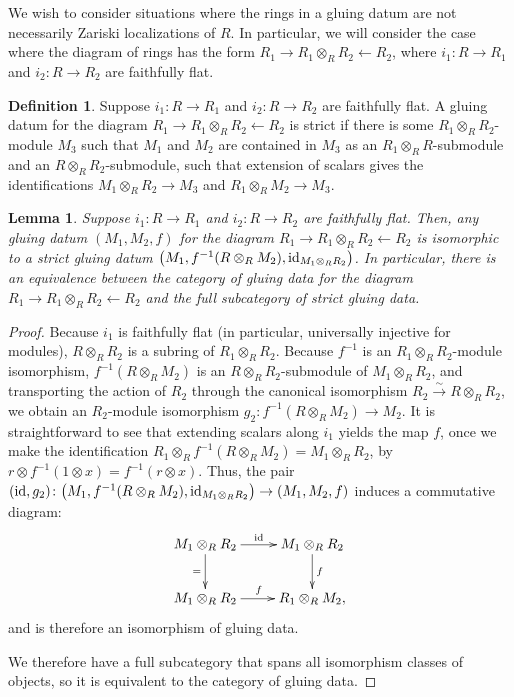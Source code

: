 \documentclass[pdftex]{sigma}
\newcommand{\simto}{\overset{\sim}{\to}}
\newtheorem{lem}[thm]{Lemma}
\theoremstyle{definition}
\newtheorem{defn}[thm]{Definition}
\begin{document}
We wish to consider situations where the rings in a gluing datum are not necessarily Zariski localizations of $R$. In particular, we will consider the case where the diagram of rings has the form $R_1 \to R_1 \otimes_{R} R_2 \leftarrow R_2$, where $i_1\colon R \to R_1$ and $i_2\colon R \to R_2$ are faithfully flat.

\begin{defn}Suppose $i_1\colon R \to R_1$ and $i_2\colon R \to R_2$ are faithfully flat. A gluing datum for the diagram $R_1 \to R_1 \otimes_{R} R_2 \leftarrow R_2$ is strict if there is some $R_1 \otimes_{R} R_2$-module $M_3$ such that $M_1$ and $M_2$ are contained in $M_3$ as an $R_1 \otimes_{R} R$-submodule and an $R \otimes_{R} R_2$-submodule, such that extension of scalars gives the identifications $M_1 \otimes_{R} R_2 \to M_3$ and $R_1 \otimes_{R} M_2 \to M_3$.
\end{defn}

\begin{lem} \label{lem:strict-gluing-data}Suppose $i_1\colon R \to R_1$ and $i_2\colon R \to R_2$ are faithfully flat. Then, any gluing datum $(M_1, M_2, f)$ for the diagram $R_1 \to R_1 \otimes_{R} R_2 \leftarrow R_2$ is isomorphic to a strict gluing datum $\big(M_1, f^{-1}(R \otimes_{R} M_2), {\rm id}_{M_1 \otimes_{R} R_2}\big)$. In particular, there is an equivalence between the category of gluing data for the diagram $R_1 \to R_1 \otimes_{R} R_2 \leftarrow R_2$ and the full subcategory of strict gluing data.
\end{lem}
\begin{proof}Because $i_1$ is faithfully flat (in particular, universally injective for modules), $R \otimes_{R} R_2$ is a subring of $R_1 \otimes_{R} R_2$. Because $f^{-1}$ is an $R_1 \otimes_{R} R_2$-module isomorphism, $f^{-1}(R \otimes_{R} M_2)$ is an $R \otimes_{R} R_2$-submodule of $M_1 \otimes_{R} R_2$, and transporting the action of $R_2$ through the canonical isomorphism $R_2 \simto R \otimes_{R} R_2$, we obtain an $R_2$-module isomorphism $g_2\colon f^{-1}(R \otimes_{R} M_2) \to M_2$. It is straightforward to see that extending scalars along $i_1$ yields the map $f$, once we make the identification $R_1 \otimes_{R} f^{-1}(R \otimes_{R} M_2) = M_1 \otimes_{R} R_2$, by $r \otimes f^{-1}(1 \otimes x) = f^{-1}(r \otimes x)$. Thus, the pair $({\rm id}, g_2)\colon \big(M_1, f^{-1}(R \otimes_{R} M_2), {\rm id}_{M_1 \otimes_{R} R_2}\big) \to (M_1, M_2, f)$ induces a commutative diagram:
\begin{gather*} \xymatrix{ M_1 \otimes_{R} R_2 \ar[d]_{=} \ar[r]^-{{\rm id}} & M_1 \otimes_{R} R_2 \ar[d]^{f} \\
M_1 \otimes_{R} R_2 \ar[r]^{f} & R_1 \otimes_{R} M_2, } \end{gather*}
and is therefore an isomorphism of gluing data.

We therefore have a full subcategory that spans all isomorphism classes of objects, so it is equivalent to the category of gluing data.
\end{proof}
\end{document}
